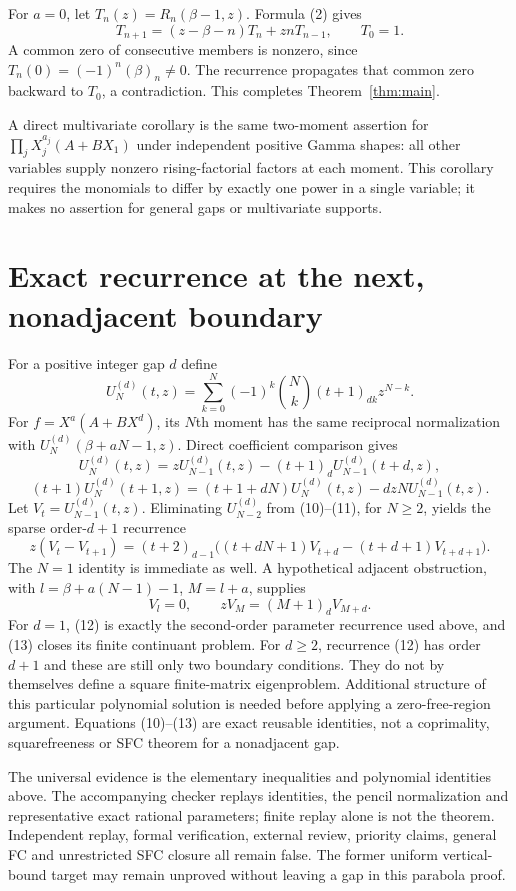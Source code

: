 \documentclass[11pt]{article}
\begin{document}
For $a=0$, let $T_n(z)=R_n(\beta-1,z)$. Formula (2) gives
\[
 T_{n+1}=(z-\beta-n)T_n+znT_{n-1},\qquad T_0=1.
\]
A common zero of consecutive members is nonzero, since
$T_n(0)=(-1)^n(\beta)_n\ne0$. The recurrence propagates that common
zero backward to $T_0$, a contradiction. This completes
Theorem~\ref{thm:main}.

A direct multivariate corollary is the same two-moment assertion for
$\prod_j X_j^{a_j}(A+BX_1)$ under independent positive Gamma shapes:
all other variables supply nonzero rising-factorial factors at each
moment. This corollary requires the monomials to differ by exactly one
power in a single variable; it makes no assertion for general gaps or
multivariate supports.

\section{Exact recurrence at the next, nonadjacent boundary}
For a positive integer gap $d$ define
\[
 U_N^{(d)}(t,z)=\sum_{k=0}^N(-1)^k\binom Nk(t+1)_{dk}z^{N-k}.
\]
For $f=X^a(A+BX^d)$, its $N$th moment has the same reciprocal
normalization with $U_N^{(d)}(\beta+aN-1,z)$.
Direct coefficient comparison gives
\[
 U_N^{(d)}(t,z)=zU_{N-1}^{(d)}(t,z)
                    -(t+1)_d U_{N-1}^{(d)}(t+d,z),           \tag{10}
\]
\[
 (t+1)U_N^{(d)}(t+1,z)
 =(t+1+dN)U_N^{(d)}(t,z)-dzN U_{N-1}^{(d)}(t,z).            \tag{11}
\]
Let $V_t=U_{N-1}^{(d)}(t,z)$. Eliminating $U_{N-2}^{(d)}$
from (10)--(11), for $N\ge2$, yields the sparse order-$d+1$ recurrence
\[
 z(V_t-V_{t+1})=(t+2)_{d-1}
       \bigl((t+dN+1)V_{t+d}-(t+d+1)V_{t+d+1}\bigr).         \tag{12}
\]
The $N=1$ identity is immediate as well.
A hypothetical adjacent obstruction, with
$l=\beta+a(N-1)-1$, $M=l+a$, supplies
\[
                    V_l=0,\qquad zV_M=(M+1)_dV_{M+d}.       \tag{13}
\]
For $d=1$, (12) is exactly the second-order parameter recurrence
used above, and (13) closes its finite continuant problem.
For $d\ge2$, recurrence (12) has order $d+1$ and these are still only
two boundary conditions. They do not by themselves define a square
finite-matrix eigenproblem. Additional structure of this particular
polynomial solution is needed before applying a zero-free-region
argument. Equations (10)--(13) are exact reusable identities, not a
coprimality, squarefreeness or SFC theorem for a nonadjacent gap.

The universal evidence is the elementary inequalities and polynomial
identities above. The accompanying checker replays identities, the
pencil normalization and representative exact rational parameters;
finite replay alone is not the theorem. Independent replay, formal
verification, external review, priority claims, general FC and unrestricted
SFC closure all remain false. The former uniform vertical-bound target
may remain unproved without leaving a gap in this parabola proof.
\end{document}
